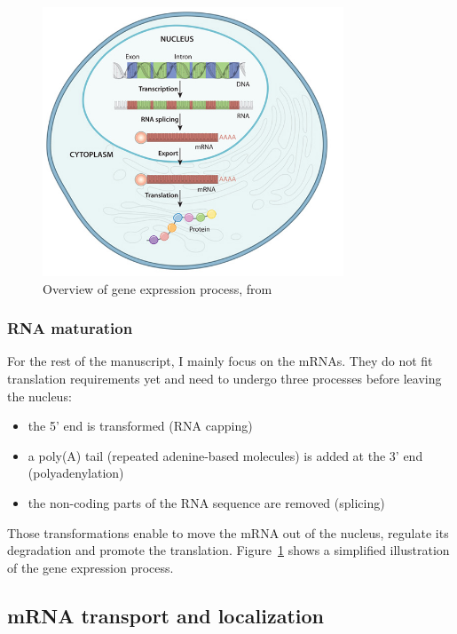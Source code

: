 \begin{figure}[]
    \centering
    \includegraphics[width=0.8\textwidth]{figures/introduction/gene_expression_process.jpg}
    \caption[Schema of gene expression process]{Overview of gene expression process, from~\cite{cell_essential_nature}}
    \label{fig:gene_expression}
\end{figure}

\subsubsection{RNA maturation}

For the rest of the manuscript, I mainly focus on the \ac{mRNA}s.
They do not fit translation requirements yet and need to undergo three processes before leaving the nucleus:
\begin{itemize}
	\setlength\itemsep{0.1em}
	\item the 5' end is transformed (\ac{RNA} capping)
	\item a poly(A) tail (repeated adenine-based molecules) is added at the 3' end (polyadenylation)
	\item the non-coding parts of the \ac{RNA} sequence are removed (splicing)
\end{itemize}

\noindent
Those transformations enable to move the \ac{mRNA} out of the nucleus, regulate its degradation and promote the translation.
Figure~\ref{fig:gene_expression} shows a simplified illustration of the gene expression process.

\subsection{mRNA transport and localization}
\label{subsec:intro_rna_transport}

